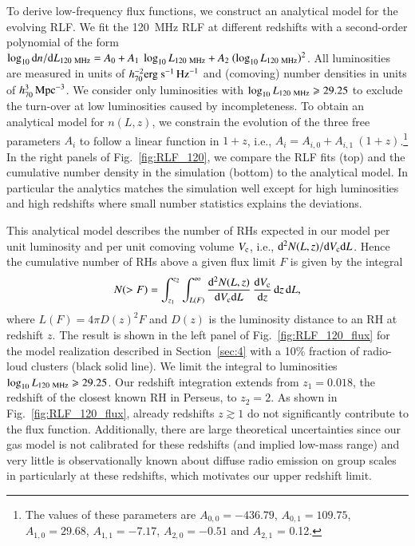 \documentclass[useAMS,usenatbib]{mn2e}
\begin{document}
To derive low-frequency flux functions, we construct an analytical model for the
evolving RLF. We fit the 120~MHz RLF at different redshifts with a second-order
polynomial of the form $\log_{10} {\mathrm{d}}n/{\mathrm{d}}L_{120~{\mathrm{MHz}}} = A_{0} +
A_{1}~\log_{10} L_{120~{\mathrm{MHz}}} + A_{2}~(\log_{10} L_{120~{\mathrm{MHz}}})^{2}$.
All luminosities are measured in units of $h_{70}^{-2}
{\mathrm{erg~s}}^{-1}\,{\mathrm{Hz}}^{-1}$ and (comoving) number densities in units of
$h_{70}^{3}\,{\mathrm{Mpc}}^{-3}$. We consider only luminosities with $\log_{10}
L_{120~{\mathrm{MHz}}} \geqslant 29.25$ to exclude the turn-over at low luminosities
caused by incompleteness. To obtain an analytical model for $n(L,z)$, we
constrain the evolution of the three free parameters $A_i$ to follow a linear
function in $1+z$, i.e., $A_{i} = A_{i,0} + A_{i,1}~(1+z)$.\footnote{The values
  of these parameters are $A_{0,0} = -436.79$, $A_{0,1} = 109.75$, $A_{1,0} =
  29.68$, $A_{1,1} = -7.17$, $A_{2,0} = -0.51$ and $A_{2,1}$ = 0.12.} In the
right panels of Fig.~\ref{fig:RLF_120}, we compare the RLF fits (top) and the
cumulative number density in the simulation (bottom) to the analytical model. In
particular the analytics matches the simulation well except for high
luminosities and high redshifts where small number statistics explains the
deviations.

This analytical model describes the number of RHs expected in our model per unit
luminosity and per unit comoving volume $V_{{\mathrm{c}}}$, i.e., ${\mathrm{d}}^2N(L,z)
/{\mathrm{d}}V_{{\mathrm{c}}}{\mathrm{d}}L$. Hence the cumulative number of RHs above a given flux
limit $F$ is given by the integral
\begin{equation}
N(>F)  =  \int_{z_1}^{z_2} \int_{L(F)}^{\infty} 
\frac{{\mathrm{d}}^2N(L,z)}{{\mathrm{d}}V_{{\mathrm{c}}}{\mathrm{d}}L}\,
\frac{{\mathrm{d}}V_{{\mathrm{c}}}}{{\mathrm{d}}z}\, {\mathrm{d}}z\, {\mathrm{d}}L ,
\label{eq:NtotRH}
\end{equation}
where $L(F) = 4 \pi D(z)^2 F$ and $D(z)$ is the luminosity distance to an RH at
redshift $z$.  The result is shown in the left panel of
Fig.~\ref{fig:RLF_120_flux} for the model realization described in
Section~\ref{sec:4} with a 10\% fraction of radio-loud clusters (black solid
line). We limit the integral to luminosities $\log_{10} L_{120~{\mathrm{MHz}}}
\geqslant 29.25$. Our redshift integration extends from $z_{1} = 0.018$, the redshift
of the closest known RH in Perseus, to $z_{2} = 2$. As shown in
Fig.~\ref{fig:RLF_120_flux}, already redshifts $z\gtrsim1$ do not
significantly contribute to the flux function. Additionally, there are large
theoretical uncertainties since our gas model is not calibrated for these
redshifts (and implied low-mass range) and very little is observationally known
about diffuse radio emission on group scales in particularly at these redshifts,
which motivates our upper redshift limit.
\end{document}
